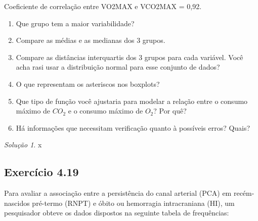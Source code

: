 \documentclass[
]{latex/krantz}
\providecommand{\tightlist}{%
  \setlength{\itemsep}{0pt}\setlength{\parskip}{0pt}}
\theoremstyle{definition}
\theoremstyle{definition}
\theoremstyle{definition}
\theoremstyle{definition}
\theoremstyle{remark}
\newtheorem*{solution}{Solução}
\begin{document}
Coeficiente de correlação entre VO2MAX e VCO2MAX = 0,92.

\begin{enumerate}
\def\labelenumi{\alph{enumi}.}
\tightlist
\item
  Que grupo tem a maior variabilidade?
\item
  Compare as médias e as medianas dos 3 grupos.
\item
  Compare as distâncias interquartis dos 3 grupos para cada variável. Você acha rasi usar a distribuição normal para esse conjunto de dados?
\item
  O que representam os asteriscos nos boxplots?
\item
  Que tipo de função você ajustaria para modelar a relação entre o consumo máximo de \(CO_2\) e o consumo máximo de \(O_2\)? Por quê?
\item
  Há informações que necessitam verificação quanto à possíveis erros? Quais?
\end{enumerate}

\begin{solution}
x
\end{solution}

\hypertarget{exr4-19}{%
\subsection*{Exercício 4.19}\label{exr4-19}}

Para avaliar a associação entre a persistência do canal arterial (PCA) em recém-nascidos pré-termo (RNPT) e óbito ou hemorragia intracraniana (HI), um pesquisador obteve os dados dispostos na seguinte tabela de frequências:
\end{document}
